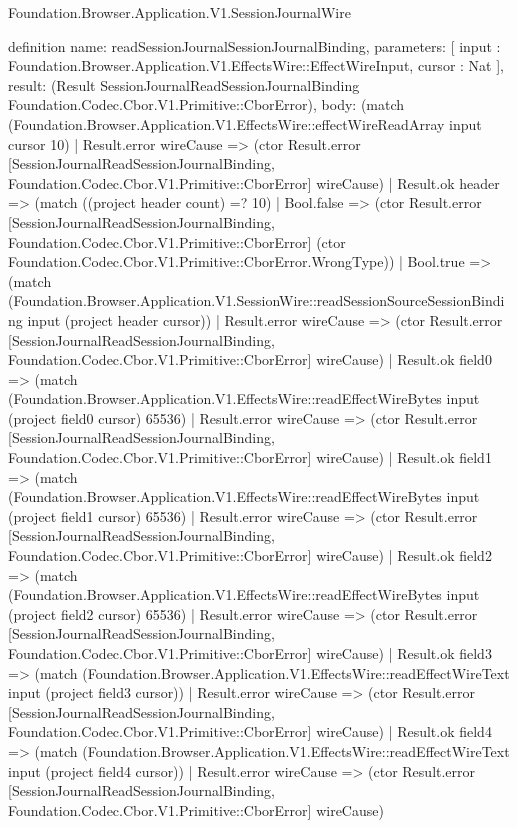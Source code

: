 \begin{lexlean}{Foundation.Browser.Application.V1.SessionJournalWire}
\begin{semanticmodule}
definition{
  name: readSessionJournalSessionJournalBinding,
  parameters: [
    input : Foundation.Browser.Application.V1.EffectsWire::EffectWireInput,
    cursor : Nat
  ],
  result: (Result SessionJournalReadSessionJournalBinding Foundation.Codec.Cbor.V1.Primitive::CborError),
  body: (match (Foundation.Browser.Application.V1.EffectsWire::effectWireReadArray input cursor 10)
    | Result.error wireCause => (ctor Result.error [SessionJournalReadSessionJournalBinding, Foundation.Codec.Cbor.V1.Primitive::CborError] wireCause)
    | Result.ok header => (match ((project header count) =? 10)
      | Bool.false => (ctor Result.error [SessionJournalReadSessionJournalBinding, Foundation.Codec.Cbor.V1.Primitive::CborError] (ctor Foundation.Codec.Cbor.V1.Primitive::CborError.WrongType))
      | Bool.true => (match (Foundation.Browser.Application.V1.SessionWire::readSessionSourceSessionBinding input (project header cursor))
        | Result.error wireCause => (ctor Result.error [SessionJournalReadSessionJournalBinding, Foundation.Codec.Cbor.V1.Primitive::CborError] wireCause)
        | Result.ok field0 => (match (Foundation.Browser.Application.V1.EffectsWire::readEffectWireBytes input (project field0 cursor) 65536)
          | Result.error wireCause => (ctor Result.error [SessionJournalReadSessionJournalBinding, Foundation.Codec.Cbor.V1.Primitive::CborError] wireCause)
          | Result.ok field1 => (match (Foundation.Browser.Application.V1.EffectsWire::readEffectWireBytes input (project field1 cursor) 65536)
            | Result.error wireCause => (ctor Result.error [SessionJournalReadSessionJournalBinding, Foundation.Codec.Cbor.V1.Primitive::CborError] wireCause)
            | Result.ok field2 => (match (Foundation.Browser.Application.V1.EffectsWire::readEffectWireBytes input (project field2 cursor) 65536)
              | Result.error wireCause => (ctor Result.error [SessionJournalReadSessionJournalBinding, Foundation.Codec.Cbor.V1.Primitive::CborError] wireCause)
              | Result.ok field3 => (match (Foundation.Browser.Application.V1.EffectsWire::readEffectWireText input (project field3 cursor))
                | Result.error wireCause => (ctor Result.error [SessionJournalReadSessionJournalBinding, Foundation.Codec.Cbor.V1.Primitive::CborError] wireCause)
                | Result.ok field4 => (match (Foundation.Browser.Application.V1.EffectsWire::readEffectWireText input (project field4 cursor))
                  | Result.error wireCause => (ctor Result.error [SessionJournalReadSessionJournalBinding, Foundation.Codec.Cbor.V1.Primitive::CborError] wireCause)
}
\end{semanticmodule}
\end{lexlean}
